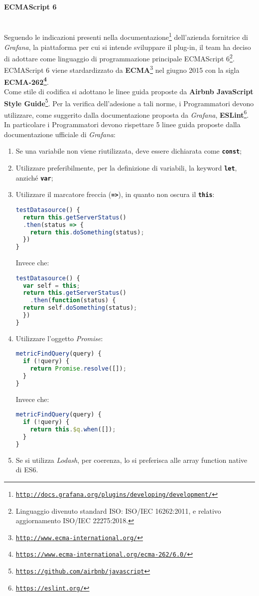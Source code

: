 \paragraph{ECMAScript 6}\label{EcmaScript6} \-\\
Seguendo le indicazioni presenti nella documentazione\footnote{\texttt{\url{http://docs.grafana.org/plugins/developing/development/}}} dell'azienda fornitrice di \textit{Grafana}, la piattaforma  per cui si intende sviluppare il plug-in, il team ha deciso di adottare come linguaggio di programmazione principale ECMAScript 6\footnote{Linguaggio divenuto standard ISO: ISO/IEC 16262:2011, e relativo aggiornamento ISO/IEC 22275:2018.}.\\
ECMAScript 6 viene stardardizzato da \textbf{ECMA}\glossario\footnote{\texttt{\url{http://www.ecma-international.org/}}} nel giugno 2015 con la sigla \textbf{ECMA-262\footnote{\texttt{\url{https://www.ecma-international.org/ecma-262/6.0/}}}}.\\
Come stile di codifica si adottano le linee guida proposte da \textbf{Airbnb JavaScript Style Guide}\footnote{\texttt{\url{https://github.com/airbnb/javascript}}}. Per la verifica dell'adesione a tali norme, i Programmatori devono utilizzare, come suggerito dalla documentazione proposta da \textit{Grafana}, \textbf{ESLint}\glossario\footnote{\texttt{\url{https://eslint.org/}}}.\\
In particolare i Programmatori devono rispettare 5 linee guida proposte dalla documentazione ufficiale di \textit{Grafana}:
\begin{enumerate}
	\item Se una variabile non viene riutilizzata, deve essere dichiarata come \texttt{\textbf{const}};
	\item Utilizzare preferibilmente, per la definizione di variabili, la keyword  \texttt{\textbf{let}}, anziché  \texttt{\textbf{var}};
	\item Utilizzare il marcatore freccia (\texttt{\textbf{=>}}), in quanto non oscura il \texttt{\textbf{this}}:
	\begin{lstlisting}[language=JavaScript]
testDatasource() {
  return this.getServerStatus()
  .then(status => {
    return this.doSomething(status);
  })
}	
	\end{lstlisting}
	Invece che:
	\begin{lstlisting}[language=JavaScript]
testDatasource() {
  var self = this;
  return this.getServerStatus()
    .then(function(status) {
  return self.doSomething(status);
  })
}
	\end{lstlisting}
	\item Utilizzare l'oggetto \textit{Promise}:
	\begin{lstlisting}[language=JavaScript]
metricFindQuery(query) {
  if (!query) {
    return Promise.resolve([]);
  }
}	
	\end{lstlisting}
	Invece che:
	\begin{lstlisting}[language=JavaScript]
metricFindQuery(query) {
  if (!query) {
    return this.$q.when([]);
  }
}
	\end{lstlisting}
	\item Se si utilizza \textit{Lodash}, per coerenza, lo si preferisca alle array function native di ES6.
\end{enumerate}

